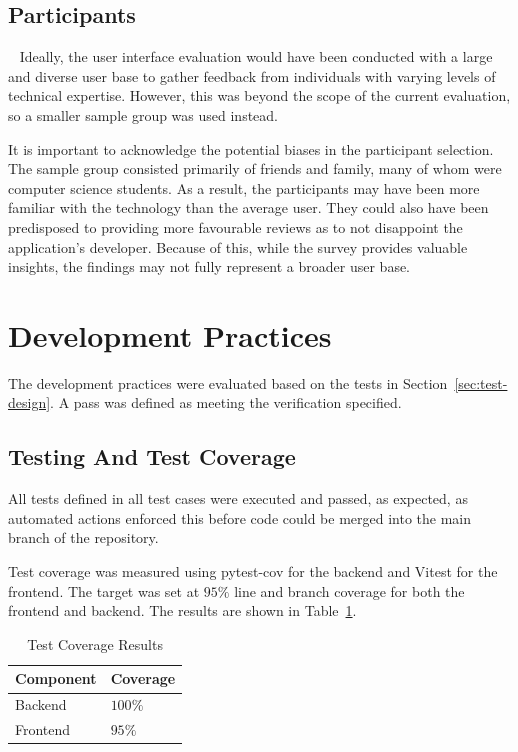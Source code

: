 \subsection{Participants}~\label{sec:ui-evaluation-participants}
Ideally, the user interface evaluation would have been conducted with a large and diverse user base to gather feedback from individuals with varying levels of technical expertise. However, this was beyond the scope of the current evaluation, so a smaller sample group was used instead.

It is important to acknowledge the potential biases in the participant selection. The sample group consisted primarily of friends and family, many of whom were computer science students. As a result, the participants may have been more familiar with the technology than the average user. They could also have been predisposed to providing more favourable reviews as to not disappoint the application's developer. Because of this, while the survey provides valuable insights, the findings may not fully represent a broader user base.

\section{Development Practices}
The development practices were evaluated based on the tests in Section~\ref{sec:test-design}. A pass was defined as meeting the verification specified.

\subsection{Testing And Test Coverage}
All tests defined in all test cases were executed and passed, as expected, as automated actions enforced this before code could be merged into the main branch of the repository.

Test coverage was measured using pytest-cov for the backend and Vitest for the frontend. The target was set at $95\%$ line and branch coverage for both the frontend and backend. The results are shown in Table~\ref{tab:test-coverage-results}.
\begin{table} [H]
    \centering
    \begin{tabular}{|m{3cm}|m{3cm}|}
        \hline
        \textbf{Component} & \textbf{Coverage} \\
        \hline
        Backend & $100\%$ \\
        \hline
        Frontend & $95\%$ \\
        \hline
    \end{tabular}
    \caption{Test Coverage Results}
    \label{tab:test-coverage-results}
\end{table}

